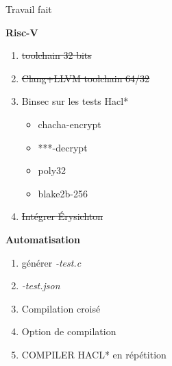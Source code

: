 \documentclass[A4,svgnames,9pt,aspectratio=169]{beamer}
\begin{document}
\begin{frame}{Travail fait}
   \begin{center}
    \begin{minipage}[t]{0.45\textwidth}
      \textbf{Risc-V}
      \begin{enumerate}
          \item[{\makebox[0pt][l]{$\square$}\raisebox{.15ex}{\hspace{0.1em}$\checkmark$}}] \sout{toolchain 32 bits}
          \item[{\makebox[0pt][l]{$\square$}\raisebox{.15ex}{\hspace{0.1em}$\checkmark$}}] \sout{Clang+LLVM toolchain 64/32}
          \item Binsec sur les tests Hacl*
          \begin{itemize}
            \item chacha-encrypt
            \item ***-decrypt
            \item poly32
            \item blake2b-256
          \end{itemize}
          \item[{\makebox[0pt][l]{$\square$}\raisebox{.15ex}{\hspace{0.1em}$\checkmark$}}] \sout{Intégrer Érysichton}
      \end{enumerate}
    \end{minipage}
    \hspace{5pt}
    \begin{minipage}[t]{0.45\textwidth}
      \textbf{Automatisation}
      \begin{enumerate}
          \item générer \textit{-test.c}
          \item \textit{-test.json}
          \item Compilation croisé
          \item Option de compilation
          \item COMPILER HACL* en répétition
      \end{enumerate}
    \end{minipage}

    \vspace{1cm}


\end{center}
\end{frame}
\end{document}
